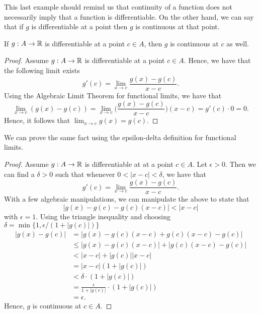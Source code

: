 This last example should remind us that continuity of a function does not necessarily imply that a function is differentiable. On the other hand, we can say that if \( g \) is differentiable at a point then \( g  \) is continuous at that point. 

\begin{theorem}
If \( g: A \to \mathbb{R}  \) is differentiable at a point \( c \in A  \), then \( g  \) is continuous at \( c  \) as well.
\end{theorem}

\begin{proof}
Assume \( g: A \to \mathbb{R}  \) is differentiable at a point \( c \in A  \). Hence, we have that the following limit exists
    \[ g'(c) = \lim_{ x \to c } \frac{ g(x) - g(c)  }{ x - c  }. \]
    Using the Algebraic Limit Theorem for functional limits, we have that 
    \[  \lim_{ x \to c  } (g(x) - g(c) ) = \lim_{ x \to c  } \Big( \frac{ g(x) - g(c)  }{ x - c  }  \Big) (x - c) = g'(c) \cdot 0 = 0. \]
    Hence, it follows that \( \lim_{ x \to c  } g(x) = g(c). \)
\end{proof}

We can prove the same fact using the epsilon-delta definition for functional limits. 
\begin{proof}
Assume \( g: A \to \mathbb{R}  \) is differentiable at at a point \( c \in A  \). Let \( \epsilon > 0  \). Then we can find a \( \delta > 0  \) such that whenever \( 0 < | x - c  | < \delta  \), we have that
    \[ g'(c) = \lim_{ x \to c } \frac{ g(x) - g(c)  }{ x - c  }. \]
    With a few algebraic manipulations, we can manipulate the above to state that
    \[  | g(x) - g(c) - g(c)(x-c)  | <  | x - c  | \tag{1}  \]
    with \( \epsilon = 1  \).
Using the triangle inequality and choosing \( \delta = \min \{ 1 , \epsilon / (1   + | g(c) | ) \}  \) 
\begin{align*}
    | g(x) - g(c)  | &= | g(x) - g(c)(x-c) + g(c)(x-c) -  g(c) |  \\
                     &\leq | g(x) - g(c)(x-c) | + | g(c)(x-c) - g(c) | \\
                     &< | x - c  | + | g(c)  | | x - c  | \\
                     &= | x - c  | (1 + | g(c) | ) \\
                     &<  \delta \cdot (1 + | g(c)  | ) \\
                     &= \frac{ \epsilon  }{ 1 + | g(c)  |  }  \cdot (1 + | g(c)  | ) \\
                     &= \epsilon.
\end{align*}
Hence, \( g  \) is continuous at \( c \in A  \).
\end{proof}
